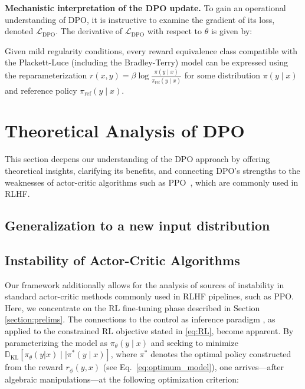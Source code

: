\textbf{Mechanistic interpretation of the DPO update.} To gain an operational understanding of DPO, it is instructive to examine the gradient of its loss, denoted $\mathcal{L}_\text{DPO}$. The derivative of $\mathcal{L}_\text{DPO}$ with respect to $\theta$ is given by:

\begin{theorem}\label{thm:main}
    Given mild regularity conditions, every reward equivalence class compatible with the Plackett-Luce (including the Bradley-Terry) model can be expressed using the reparameterization ${r(x, y) = \beta \log \frac{\pi(y\mid x)}{\pi_\text{ref}(y\mid x)}}$ for some distribution $\pi(y\mid x)$ and reference policy $\pi_\text{ref}(y \mid x)$.
\end{theorem}

\section{Theoretical Analysis of DPO} This section deepens our understanding of the DPO approach by offering theoretical insights, clarifying its benefits, and connecting DPO’s strengths to the weaknesses of actor-critic algorithms such as PPO~\cite{schulman2017proximal}, which are commonly used in RLHF.

\subsection{Generalization to a new input distribution}

\subsection{Instability of Actor-Critic Algorithms} Our framework additionally allows for the analysis of sources of instability in standard actor-critic methods commonly used in RLHF pipelines, such as PPO. Here, we concentrate on the RL fine-tuning phase described in Section \ref{section:prelims}. The connections to the control as inference paradigm \cite{levine2018reinforcement}, as applied to the constrained RL objective stated in \ref{eq:RL}, become apparent. By parameterizing the model as $\pi_{\theta}(y\mid x)$ and seeking to minimize $\mathbb{D}_{\text{KL}}[\pi_{\theta}(y|x) \mid \mid \pi^*(y\mid x)]$, where $\pi^*$ denotes the optimal policy constructed from the reward $r_{\phi}(y, x)$ (see Eq.~\ref{eq:optimum_model}), one arrives—after algebraic manipulations—at the following optimization criterion:

